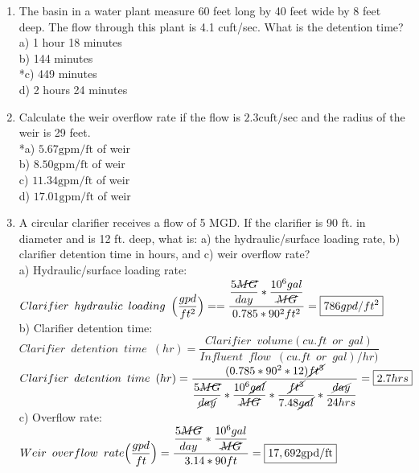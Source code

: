 \documentclass{article}
\begin{document}
\begin{enumerate}

	  \item The basin in a water plant measure 60 feet long by 40 feet wide by 8 feet deep. The flow through this plant is 4.1 cuft/sec. What is the detention time?\\
a) 1 hour 18 minutes\\
b) 144 minutes\\
*c) 449 minutes\\
d) 2 hours 24 minutes\\


  \item Calculate the weir overflow rate if the flow is $2.3 \mathrm{cuft} / \mathrm{sec}$ and the radius of the weir is 29 feet.\\
*a) $5.67 \mathrm{gpm} / \mathrm{ft}$ of weir\\
b) $8.50 \mathrm{gpm} / \mathrm{ft}$ of weir\\
c) $11.34 \mathrm{gpm} / \mathrm{ft}$ of weir\\
d) $17.01 \mathrm{gpm} / \mathrm{ft}$ of weir\\

\item A circular clarifier receives a flow of 5 MGD.  If the clarifier is 90 ft. in diameter and is 12 ft. deep, what is: a) the hydraulic/surface loading rate, b) clarifier detention time in hours, and c) weir overflow rate?\\
		\vspace{0.2cm}
a) Hydraulic/surface loading rate:\\
$Clarifier \enspace hydraulic \enspace loading \enspace 	\Big(\dfrac{gpd}{ft^2}\Big) ==\dfrac{\dfrac{5\cancel{MG}}{{day}}*\dfrac{10^6gal}{\cancel{MG}}}{0.785*90^2 ft^2}=\boxed{786gpd/ft^2}$\\
		\vspace{0.5cm}
b) Clarifier detention time:\\
$Clarifier \enspace detention \enspace time \enspace (hr) = 	\dfrac{ Clarifier \enspace volume (cu.ft \enspace or \enspace gal)}{Influent \enspace flow \enspace (cu.ft \enspace or \enspace gal)/hr)}$\\
		\vspace{0.2cm}
$Clarifier \enspace detention \enspace time \enspace (hr) = 	\dfrac{(0.785*90^2*12)\cancel{ft^3}}{\dfrac{5\cancel{MG}}{\cancel{day}}*\dfrac{10^6\cancel{gal}}{\cancel{MG}}*\dfrac{\cancel{ft^3}}{7.48\cancel{gal}}*\dfrac{\cancel{day}}{24hrs}}=\boxed{2.7hrs}$\\
		\vspace{0.5cm}
c) Overflow rate:\\
		\vspace{0.2cm} 
$Weir \enspace overflow \enspace rate \Big(\dfrac{gpd}{ft}\Big) =\dfrac{\dfrac{5\cancel{MG}}{{day}}*\dfrac{10^6gal}{\cancel{MG}}}{3.14*90 ft}=\boxed{17,692 \mathrm{gpd}/\mathrm{ft}}$\\



\end{enumerate}
\end{document}
